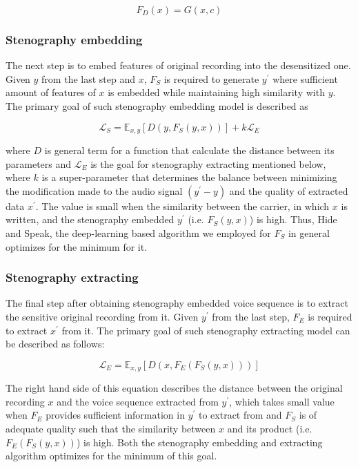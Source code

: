 \documentclass[conference]{IEEEtran}
\begin{document}
\begin{equation}
    \label{eqn:fd_val}
    F_D(x) = G(x, c)
\end{equation}

\subsubsection{Stenography embedding}

The next step is to embed features of original recording into the desensitized one. Given $y$ from the last step and $x$, $F_S$ is required to generate $y^{\prime}$ where sufficient amount of features of $x$ is embedded while maintaining high similarity with $y$. The primary goal of such stenography embedding model is described as

\begin{equation}
    \label{eqn:embed_loss}
    \mathcal{L}_S = \mathbb{E}_{x, y}[D(y, F_S(y, x))] + k\mathcal{L}_E
\end{equation}

where $D$ is general term for a function that calculate the distance between its parameters and $\mathcal{L}_E$ is the goal for stenography extracting mentioned below, where $k$ is a super-parameter that determines the balance between minimizing the modification made to the audio signal $(y^{\prime} - y)$ and the quality of extracted data $x^{\prime}$. The value is small when the similarity between the carrier, in which $x$ is written, and the stenography embedded $y^{\prime}$ (i.e. $F_S(y, x)$) is high. Thus, Hide and Speak\cite{has}, the deep-learning based algorithm we employed for $F_S$ in general optimizes for the minimum for it.

\subsubsection{Stenography extracting}

The final step after obtaining stenography embedded voice sequence is to extract the sensitive original recording from it. Given $y^{\prime}$ from the last step, $F_E$ is required to extract $x^{\prime}$ from it. The primary goal of such stenography extracting model can be described as follows:

\begin{equation}
    \label{eqn:extract_loss}
    \mathcal{L}_E = \mathbb{E}_{x, y}[D(x, F_E(F_S(y, x)))]
\end{equation}

The right hand side of this equation describes the distance between the original recording $x$ and the voice sequence extracted from $y^{\prime}$, which takes small value when $F_E$ provides sufficient information in $y^{\prime}$ to extract from and $F_S$ is of adequate quality such that the similarity between $x$ and its product (i.e. $F_E(F_S(y, x))$) is high. Both the stenography embedding and extracting algorithm optimizes for the minimum of this goal.
\end{document}
